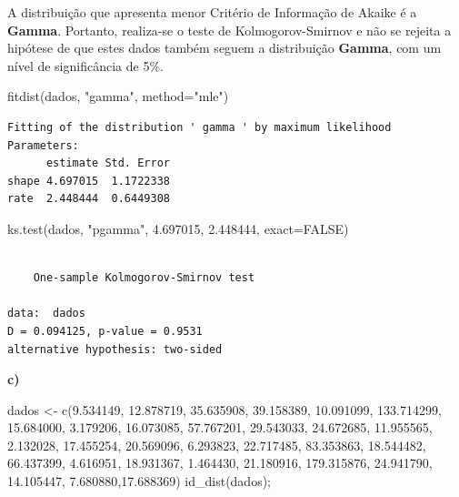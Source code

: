\documentclass[
  letterpaper,
  DIV=11,
  numbers=noendperiod]{scrartcl}
\newenvironment{Shaded}{\begin{snugshade}}{\end{snugshade}}
\newcommand{\AttributeTok}[1]{\textcolor[rgb]{0.40,0.45,0.13}{#1}}
\newcommand{\ConstantTok}[1]{\textcolor[rgb]{0.56,0.35,0.01}{#1}}
\newcommand{\FloatTok}[1]{\textcolor[rgb]{0.68,0.00,0.00}{#1}}
\newcommand{\FunctionTok}[1]{\textcolor[rgb]{0.28,0.35,0.67}{#1}}
\newcommand{\NormalTok}[1]{\textcolor[rgb]{0.00,0.23,0.31}{#1}}
\newcommand{\OtherTok}[1]{\textcolor[rgb]{0.00,0.23,0.31}{#1}}
\newcommand{\StringTok}[1]{\textcolor[rgb]{0.13,0.47,0.30}{#1}}
\begin{document}
A distribuição que apresenta menor Critério de Informação de Akaike é a
\textbf{Gamma}. Portanto, realiza-se o teste de Kolmogorov-Smirnov e não
se rejeita a hipótese de que estes dados também seguem a distribuição
\textbf{Gamma}, com um nível de significância de 5\%.

\begin{Shaded}
\begin{Highlighting}[]
\FunctionTok{fitdist}\NormalTok{(dados, }\StringTok{"gamma"}\NormalTok{, }\AttributeTok{method=}\StringTok{"mle"}\NormalTok{)}
\end{Highlighting}
\end{Shaded}

\begin{verbatim}
Fitting of the distribution ' gamma ' by maximum likelihood 
Parameters:
      estimate Std. Error
shape 4.697015  1.1722338
rate  2.448444  0.6449308
\end{verbatim}

\begin{Shaded}
\begin{Highlighting}[]
\FunctionTok{ks.test}\NormalTok{(dados, }\StringTok{"pgamma"}\NormalTok{, }\FloatTok{4.697015}\NormalTok{, }\FloatTok{2.448444}\NormalTok{, }\AttributeTok{exact=}\ConstantTok{FALSE}\NormalTok{)}
\end{Highlighting}
\end{Shaded}

\begin{verbatim}

    One-sample Kolmogorov-Smirnov test

data:  dados
D = 0.094125, p-value = 0.9531
alternative hypothesis: two-sided
\end{verbatim}

\textbf{c)}

\begin{Shaded}
\begin{Highlighting}[]
\NormalTok{dados }\OtherTok{\textless{}{-}} \FunctionTok{c}\NormalTok{(}\FloatTok{9.534149}\NormalTok{, }\FloatTok{12.878719}\NormalTok{, }\FloatTok{35.635908}\NormalTok{, }\FloatTok{39.158389}\NormalTok{, }\FloatTok{10.091099}\NormalTok{, }\FloatTok{133.714299}\NormalTok{, }\FloatTok{15.684000}\NormalTok{, }\FloatTok{3.179206}\NormalTok{, }\FloatTok{16.073085}\NormalTok{, }\FloatTok{57.767201}\NormalTok{, }\FloatTok{29.543033}\NormalTok{, }\FloatTok{24.672685}\NormalTok{, }\FloatTok{11.955565}\NormalTok{, }\FloatTok{2.132028}\NormalTok{, }\FloatTok{17.455254}\NormalTok{, }\FloatTok{20.569096}\NormalTok{, }\FloatTok{6.293823}\NormalTok{, }\FloatTok{22.717485}\NormalTok{, }\FloatTok{83.353863}\NormalTok{, }\FloatTok{18.544482}\NormalTok{, }\FloatTok{66.437399}\NormalTok{, }\FloatTok{4.616951}\NormalTok{, }\FloatTok{18.931367}\NormalTok{, }\FloatTok{1.464430}\NormalTok{, }\FloatTok{21.180916}\NormalTok{, }\FloatTok{179.315876}\NormalTok{, }\FloatTok{24.941790}\NormalTok{, }\FloatTok{14.105447}\NormalTok{, }\FloatTok{7.680880}\NormalTok{,}\FloatTok{17.688369}\NormalTok{)}
\FunctionTok{id\_dist}\NormalTok{(dados);}
\end{Highlighting}
\end{Shaded}
\end{document}
